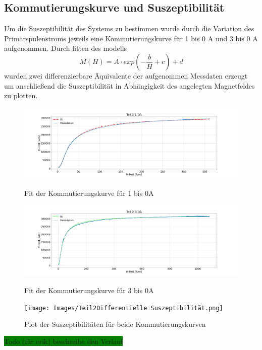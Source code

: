     \subsection{Kommutierungskurve und Suszeptibilität}
        Um die Suszeptibilität des Systems zu bestimmen wurde durch die Variation des Primärspulenstroms jeweils eine Kommutierungskurve für 1 bis 0 A und 3 bis 0 A aufgenommen.
        Durch fitten des modells 
        \begin{equation}
            M(H) = A \cdot exp(-\frac{b}{H} + c) + d
        \end{equation}
        wurden zwei differenzierbare Äquivalente der aufgenommen Messdaten erzeugt um anschließend die Suszeptibilität in Abhängigkeit des angelegten Magnetfeldes zu plotten.
        \begin{figure}[ht]
            \centering
            \includegraphics[width=\textwidth]{Images/Teil2Teil 2 1-0A.png}
            \label{Teil2-1A}
            \caption{Fit der Kommutierungskurve für 1 bis 0A}
        \end{figure}
        \begin{figure}[ht]
            \centering
            \includegraphics[width=\textwidth]{Images/Teil2Teil 2 3-0A.png}
            \label{Teil2-3A}
            \caption{Fit der Kommutierungskurve für 3 bis 0A}
        \end{figure}
        \begin{figure}[ht]
            \centering
            \texttt{[image: Images/Teil2Differentielle Suszeptibilität.png]}
            \label{DiffSus}
            \caption{Plot der Suszeptibilitäten für beide Kommutierungskurven}
        \end{figure}
        \colorbox{green}{Todo (für erik) beschreibe den Verlauf}
